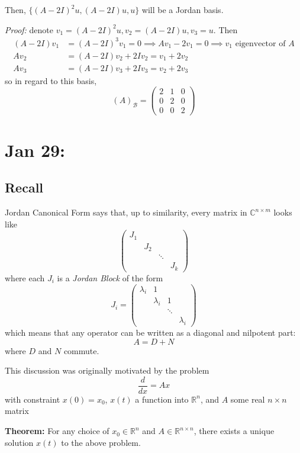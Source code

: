 \documentclass[12pt]{article}
\newcommand{\R}{\mathbb{R}}
\newcommand{\C}{\mathbb{C}}
\begin{document}
    Then, $\{(A - 2I)^2u, (A-2I)u, u\}$ will be a Jordan basis. 

    \emph{Proof:} denote $v_1 = (A-2I)^2 u, v_2 = (A-2I)u, v_3 = u$. Then 
    \begin{align*}
        (A- 2I)v_1 &= (A-2I)^3 v_1 = 0 \implies Av_1 - 2v_1 = 0 \implies v_1 \text{ eigenvector of } A\\ 
        Av_2 &= (A - 2I)v_2 + 2Iv_2 = v_1 + 2v_2\\ 
        Av_3 &= (A - 2I)v_3 + 2Iv_3 = v_2 + 2v_3
    \end{align*}
    so in regard to this basis, 
    \[(A)_{\mathcal{B}} = \begin{pmatrix}
        2 & 1 & 0\\ 
        0 & 2 & 0\\
        0 & 0 & 2
    \end{pmatrix}\]

\section{Jan 29:}
\subsection*{Recall} 
    Jordan Canonical Form says that, up to similarity, every matrix in $\C^{n \times m}$ looks like 
    \[\begin{pmatrix}
        J_1\\ 
        & J_2\\
        & & \ddots\\
        & & & J_k
    \end{pmatrix}\] 
    where each $J_i$ is a \emph{Jordan Block} of the form 
    \[J_i = \begin{pmatrix}
        \lambda_i & 1\\ 
        & \lambda_i & 1\\
        & & \ddots\\
        & & & \lambda_i
    \end{pmatrix}\]
    which means that any operator can be written as a diagonal and nilpotent part:
    \[A = D + N\]
    where $D$ and $N$ commute.  

    This discussion was originally motivated by the problem 
    \[\frac{d}{dx} = Ax\]
    with constraint $x(0) = x_0$, $x(t)$ a function into $\R^n$, and $A$ some real $n \times n$ matrix

    \textbf{Theorem:} For any choice of $x_0 \in \R^n$ and $A \in \R^{n \times n}$, there exists a unique solution $x(t)$ to the above problem.
\end{document}
